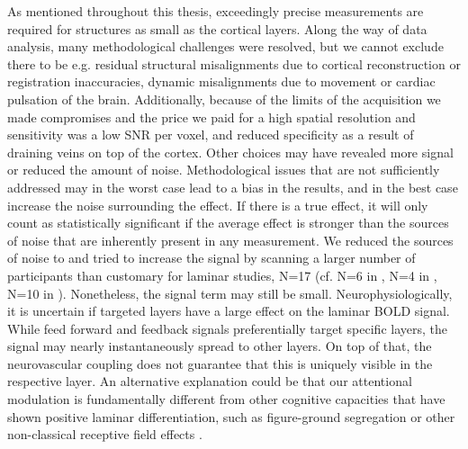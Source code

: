 As mentioned throughout this thesis, exceedingly precise measurements are required for structures as small as the cortical layers. Along the way of data analysis, many methodological challenges were resolved, but we cannot exclude there to be e.g. residual structural misalignments due to cortical reconstruction or registration inaccuracies, dynamic misalignments due to movement or cardiac pulsation of the brain. Additionally, because of the limits of the acquisition we made compromises and the price we paid for a high spatial resolution and sensitivity was a low SNR per voxel, and reduced specificity as a result of draining veins on top of the cortex. Other choices may have revealed more signal or reduced the amount of noise. Methodological issues that are not sufficiently addressed may in the worst case lead to a bias in the results, and in the best case increase the noise surrounding the effect. If there is a true effect, it will only count as statistically significant if the average effect is stronger than the sources of noise that are inherently present in any measurement. We reduced the sources of noise to and tried to increase the signal by scanning a larger number of participants than customary for laminar studies, N=17 (cf. N=6 in \cite{Polimeni2010}, N=4 in \cite{Muckli2015}, N=10 in \cite{Kok2016}). Nonetheless, the signal term may still be small. Neurophysiologically, it is uncertain if targeted layers have a large effect on the laminar BOLD signal. While feed forward and feedback signals preferentially target specific layers, the signal may nearly instantaneously spread to other layers. On top of that, the neurovascular coupling does not guarantee that this is uniquely visible in the respective layer. An alternative explanation could be that our attentional modulation is fundamentally different from other cognitive capacities that have shown positive laminar differentiation, such as figure-ground segregation \cite{Kok2015} or other non-classical receptive field effects \cite{Muckli2015}. 

